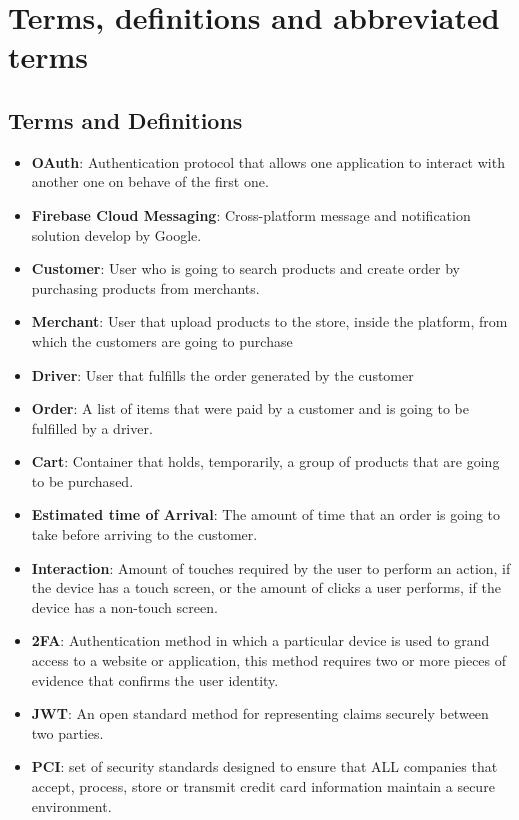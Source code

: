 \section{Terms, definitions and abbreviated terms}
\subsection{Terms and Definitions}
\begin{itemize}
    \item \textbf{OAuth}: Authentication protocol that allows one application 
    to interact with another one on behave of the first one.
    \item \textbf{Firebase Cloud Messaging}: Cross-platform message and 
    notification solution develop by Google.
    \item \textbf{Customer}: User who is going to search products and create 
    order by purchasing products from merchants.
    \item \textbf{Merchant}: User that upload products to the store, 
    inside the platform, from which the customers are going to purchase 
    \item \textbf{Driver}: User that fulfills the order generated by the 
    customer 
    \item \textbf{Order}: A list of items that were paid by a customer and 
    is going to be fulfilled by a driver.
    \item \textbf{Cart}: Container that holds, temporarily, a group of products 
    that are going to be purchased.
    \item \textbf{Estimated time of Arrival}: The amount of time that 
    an order is going to take before arriving to the customer.
    \item \textbf{Interaction}: Amount of touches required by the user to 
    perform an action, if the device has a touch screen, or the amount of 
    clicks a user performs, if the device has a non-touch screen.
    \item \textbf{2FA}: Authentication method in which a particular device is 
    used to grand access to a website or application, this method requires 
    two or more pieces of evidence that confirms the user identity.
    \item \textbf{JWT}: An open standard method for representing claims 
    securely between two parties.
    \item \textbf{PCI}: set of security standards designed to ensure that ALL 
    companies that accept, process, store or transmit credit card 
    information maintain a secure environment. \cite{pci}
\end{itemize}
\pagebreak

